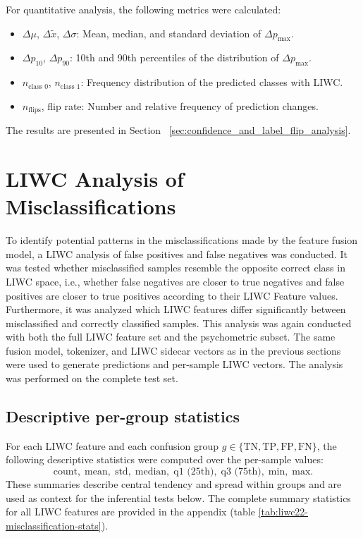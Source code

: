 For quantitative analysis, the following metrics were calculated:
\begin{itemize}
    \item $\Delta \mu$, $\Delta \tilde{x}$, $\Delta \sigma$: Mean, median, and standard deviation of \(\Delta p_{\max}\).
    \item $\Delta p_{10}$, $\Delta p_{90}$: 10th and 90th percentiles of the distribution of \(\Delta p_{\max}\).
    \item $n_{\text{class 0}}$, $n_{\text{class 1}}$: Frequency distribution of the predicted classes with LIWC.
    \item $n_{\text{flips}}$, flip rate: Number and relative frequency of prediction changes.
\end{itemize}


The results are presented in Section ~\ref{sec:confidence_and_label_flip_analysis}.

\section{LIWC Analysis of Misclassifications}

To identify potential patterns in the misclassifications made by the feature fusion model, a LIWC analysis of false positives and false negatives was conducted. It was tested whether misclassified samples resemble the opposite correct class in LIWC space, i.e., whether false negatives are closer to true negatives and false positives are closer to true positives according to their LIWC Feature values. Furthermore, it was analyzed which LIWC features differ significantly between misclassified and correctly classified samples. This analysis was again conducted with both the full LIWC feature set and the psychometric subset. The same fusion model, tokenizer, and LIWC sidecar vectors as in the previous sections were used to generate predictions and per-sample LIWC vectors. The analysis was performed on the complete test set.

\subsection{Descriptive per-group statistics}
For each LIWC feature and each confusion group \(g \in \{\mathrm{TN},\mathrm{TP},\mathrm{FP},\mathrm{FN}\}\), the following descriptive statistics were computed over the per-sample values:
\[
\text{count},\;\text{mean},\;\text{std},\;\text{median},\;\text{q1 (25th)},\;\text{q3 (75th)},\;\text{min},\;\text{max}.
\]
These summaries describe central tendency and spread within groups and are used as context for the inferential tests below. The complete summary statistics for all LIWC features are provided in the appendix (table \ref{tab:liwc22-misclassification-stats}).


